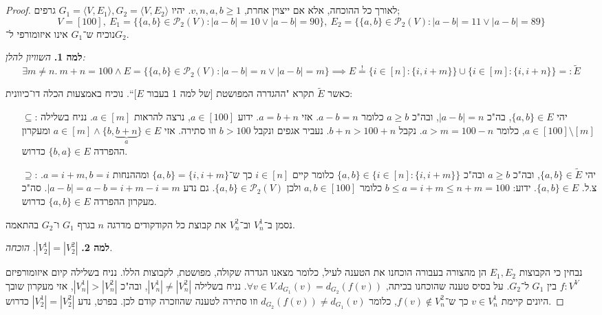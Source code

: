 \documentclass[]{article}
\newcommand\ps    {\mathcal{P}}
\newcommand\ra    {\rangle}
\newcommand\la    {\langle}
\newcommand\seq   {\overset{!}{=}}
\newcommand\tl    {\tilde}
\begin{document}
	\section{}
	\begin{proof}
		לאורך כל ההוכחה, אלא אם ייצוין אחרת, $v, n, a, b \ge 1$. 
		יהיו $G_1 = \la V, E_1 \ra, G_2 = \la V, E_2 \ra$ גרפים;
		\[ V = [100], \ E_1 = \{\{a, b\} \in \ps_2(V) \colon |a - b| = 10 \lor |a - b| = 90\}, \ E_2 = \{\{a, b\} \in \ps_2(V) \colon |a - b| = 11 \lor |a - b| = 89\} \]
		נוכיח ש־$G_1$ אינו איזומורפי ל־$G_2$. 
		
		\textbf{למה 1. }\textit{השוויון להלן: }
		\[ \exists m \neq n. \ m + n = 100 \land E = \{\{a, b\} \in \ps_2(V) \colon |a - b| = n \lor |a - b| = m\} \!\!\implies\!\! E \seq \{i \in [n] \colon \{i, i + m\}\} \cup \{i \in [m] \colon \{i, i + n\}\} =: \tl E \]
		
		כאשר $\tl E$ תקרא "ההגדרה המפושטת [של למה 1 בעבור $E$]``. 
		נוכיח באמצעות הכלה דו־כיוונית: 
		\begin{itemize}
			\item[$\subseteq$:] יהי $\{a, b\} \in E$, בה"כ $|a - b| = n$, ובה"כ $a \ge b$ כלומר $a - b = n$. אזי $a = b + n$. ידוע $a \in [100]$, נרצה להראות $a \in [m]$. נניח בשלילה $a \in [100] \setminus [m]$, כלומר $a > m = 100 - n$. נקבל $b + n > 100 + n$. נעביר אגפים ונקבל $b > 100$ וזו סתירה. אזי $a \in [m] \land \{b, \underbrace{b + n}_{a}\} \in E$ ומעקרון ההפרדה $\{b, a\} \in E$ כדרוש. 
			\item[$\supseteq$:] יהי $\{a, b\} \in \tl E$, ובה"כ $a \ge b$ ובה"כ $\{a, b\} \in \{i \in [n] \colon \{i, i + m\}\}$ כלומר קיים $i \in [n]$ כך ש־$\{a, b\} = \{i, i + m\}$ ומההנחות $a = i + m, b = i$. צ.ל. $\{a, b\} \in E$. ידוע: $b \le a = i + m \le n + m = 100$ כלומר $a, b \in [100]$ ולכן $\{a, b\} \in \ps_2(V)$. גם נדע $|a - b| = a - b = i + m - i = m$. סה"כ מעקרון ההפרדה $\{a, b\} \in E$ כדרוש. 
		\end{itemize}
		
		נסמן ב־$V_n^1$ וב־$V_n^2$ את קבוצת כל הקודקודים מדרגה $n$ בגרף $G_1$ ו־$G_2$ בהתאמה. 
		
		\textbf{למה 2. }$|V_2^1| = |V_2^2|$. \textit{הוכחה.}
		
		נבחין כי הקבוצות $E_1, E_2$ הן מהצורה בעבורה הוכחנו את הטענה לעיל, כלומר מצאנו הגדרה שקולה, מפושטת, לקבוצות הללו. נניח בשלילה קיום איזומורפיזם $f \colon V^V$ בין $G_1$ ל־$G_2$. על בסיס טענה שהוכחנו בכיתה, $\forall v \in V. d_{G_1}(v) = d_{G_2}(f(v))$. נניח בשלילה $|V_n^1| \neq |V_n^2|$, ובה"כ $|V_n^1| > |V_n^2|$, אזי מעקרון שובך היונים קיימת $v \in V_n^1$ כך ש־$f(v) \notin V_n^2$, כלומר $d_{G_2}(f(v)) \neq d_{G_1}(v)$ וזו סתירה לטענה שהוזכרה קודם לכן. בפרט, נדע $|V_2^1| = |V_2^2|$ כדרוש. 
		

\end{proof}
\end{document}
